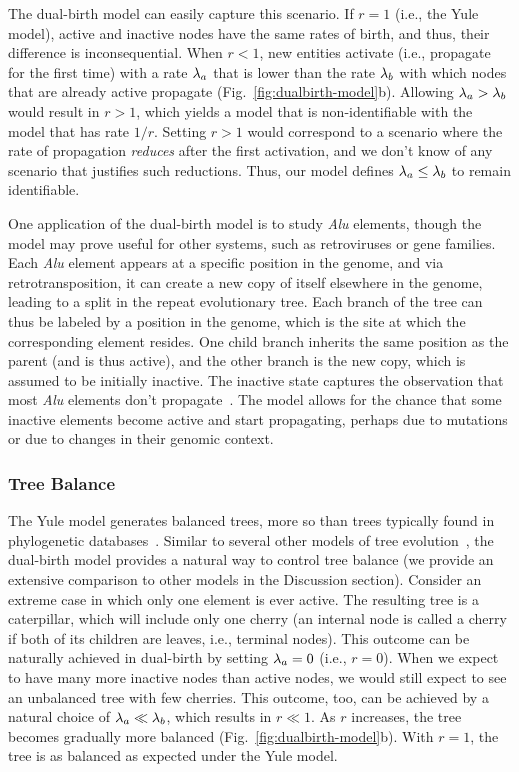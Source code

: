 The dual-birth model can easily capture this scenario. If $r=1$ (i.e., the Yule model), active and inactive nodes have the same rates of birth, and thus, their difference is inconsequential. When $r<1$, new entities activate (i.e., propagate for the first time) with a rate $\lambda_a$ that is lower than the rate $\lambda_b$ with which nodes that are already active propagate (Fig.~\ref{fig:dualbirth-model}b). Allowing $\lambda_a > \lambda_b$ would result in $r > 1$, which yields a model that is non-identifiable with the model that has rate $1/r$. Setting $r>1$ would correspond to a scenario where the rate of propagation \textit{reduces} after the first activation, and we don't know of any scenario that justifies such reductions. Thus, our model defines $\lambda_a\leq\lambda_b$ to remain identifiable.

One application of the dual-birth model is to study \textit{Alu} elements, though the model may prove useful for other systems, such as retroviruses or gene families. Each \textit{Alu} element appears at a specific position in the genome, and via retrotransposition, it can create a new copy of itself elsewhere in the genome, leading to a split in the repeat evolutionary tree. Each branch of the tree can thus be labeled by a position in the genome, which is the site at which the corresponding element resides. One child branch inherits the same position as the parent (and is thus active), and the other branch is the new copy, which is assumed to be initially inactive. The inactive state captures the observation that most \textit{Alu} elements don't propagate~\cite{Batzer2002}. The model allows for the chance that some inactive elements become active and start propagating, perhaps due to mutations or due to changes in their genomic context.

\subsubsection{Tree Balance}
The Yule model generates balanced trees, more so than trees typically found in phylogenetic databases~\cite{Guyer1991,Blum2006,Jones2011}. Similar to several other models of tree evolution~\cite{Aldous1996,Blum2006,Maddison2007}, the dual-birth model provides a natural way to control tree balance (we provide an extensive comparison to other models in the Discussion section). Consider an extreme case in which only one element is ever active. The resulting tree is a caterpillar, which will include only one cherry (an internal node is called a cherry if both of its children are leaves, i.e., terminal nodes). This outcome can be naturally achieved in dual-birth by setting $\lambda_a=0$ (i.e., $r=0$). When we expect to have many more inactive nodes than active nodes, we would still expect to see an unbalanced tree with few cherries. This outcome, too, can be achieved by a natural choice of $\lambda_a\ll\lambda_b$, which results in $r\ll 1$. As $r$ increases, the tree becomes gradually more balanced (Fig.~\ref{fig:dualbirth-model}b). With $r=1$, the tree is as balanced as expected under the Yule model.


